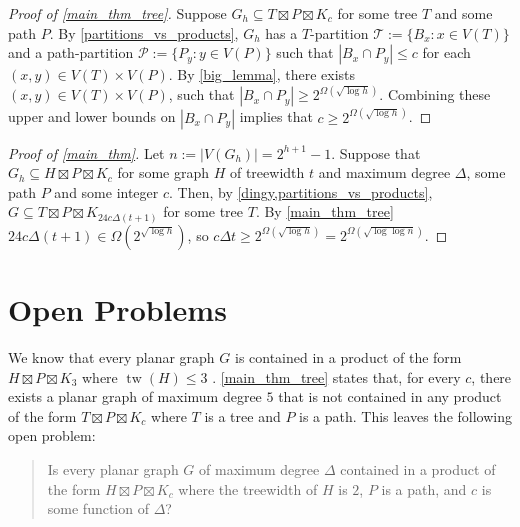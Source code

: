 \documentclass{patmorin}
\DeclareMathOperator{\tw}{tw}
\newcommand\subsetcong{\mathrel{\text{%
    \setbox0\hbox{$\subseteq$}%
    \rlap{\hbox to \wd0{\hss\hss\hss\raisebox{1.5\height}{$\sim$}\hss}}\box0
}}}
\renewcommand{\subsetcong}{\subseteq}
\renewcommand{\le}{\leqslant}
\renewcommand{\ge}{\geqslant}
\begin{document}
\begin{proof}[Proof of \cref{main_thm_tree}]
  Suppose $G_h\subsetcong T\boxtimes P\boxtimes K_c$ for some tree $T$ and some path $P$.  By \cref{partitions_vs_products}, $G_h$ has a $T$-partition $\mathcal{T}:=\{B_x:x\in V(T)\}$ and a path-partition $\mathcal{P}:=\{P_y:y\in V(P)\}$ such that $|B_x\cap P_y|\le c$ for each $(x,y)\in V(T)\times V(P)$.  By \cref{big_lemma}, there exists $(x,y)\in V(T)\times V(P)$, such that $|B_x\cap P_y| \ge 2^{\Omega(\sqrt{\log h})}$.  Combining these upper and lower bounds on $|B_x\cap P_y|$ implies that $c\ge 2^{\Omega(\sqrt{\log h})}$.
\end{proof}

\begin{proof}[Proof of \cref{main_thm}]
  Let $n:=|V(G_h)|=2^{h+1}-1$.  Suppose that $G_h\subsetcong H\boxtimes P\boxtimes K_c$ for some graph $H$ of treewidth $t$ and maximum degree $\Delta$, some path $P$ and some integer $c$.  Then, by \cref{dingy,partitions_vs_products}, $G\subsetcong T\boxtimes P\boxtimes K_{24 c \Delta (t+1)}$ for some tree $T$.  By \cref{main_thm_tree} $24 c \Delta (t+1) \in \Omega(2^{\sqrt{\log h}})$, so $c\Delta t \ge 2^{\Omega(\sqrt{\log h})} = 2^{\Omega(\sqrt{\log\log n})}$.
\end{proof}



\section{Open Problems}

We know that every planar graph $G$ is contained in a product of the form $H\boxtimes P\boxtimes K_3$ where $\tw(H)\le 3$ \cite{dujmovic.joret.ea:planar}. \cref{main_thm_tree} states that, for every $c$, there exists a planar graph of maximum degree $5$ that is not contained in any product of the form $T\boxtimes P\boxtimes K_c$ where $T$ is a tree and $P$ is a path.  This leaves the following open problem:

\begin{quote}

  Is every planar graph $G$ of maximum degree $\Delta$ contained in a product of the form $H\boxtimes P\boxtimes K_c$ where the treewidth of $H$ is $2$, $P$ is a path, and $c$ is some function of $\Delta$?
\end{quote}
\end{document}

